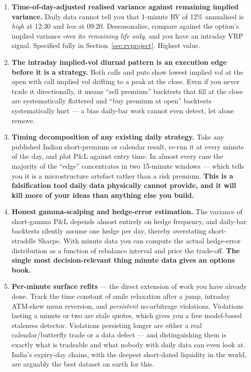 \documentclass[11pt,a4paper]{article}
\begin{document}
\begin{enumerate}
\item \textbf{Time-of-day-adjusted realised variance against remaining implied
variance.} Daily data cannot tell you that 1-minute RV of 12\% annualised is
\emph{high} at 12:30 and \emph{low} at 09:20. Deseasonalise, compare against the
option's implied variance over its \emph{remaining life only}, and you have an
intraday VRP signal. Specified fully in Section~\ref{sec:rvproject}. Highest value.

\item \textbf{The intraday implied-vol diurnal pattern is an execution edge before
it is a strategy.} Both calls and puts show lowest implied vol at the open with
call implied vol drifting to a peak at the close. Even if you never trade it
directionally, it means ``sell premium'' backtests that fill at the close are
systematically flattered and ``buy premium at open'' backtests systematically hurt
--- a bias daily-bar work cannot even detect, let alone remove.

\item \textbf{Timing decomposition of any existing daily strategy.} Take any
published Indian short-premium or calendar result, re-run it at every minute of
the day, and plot P\&L against entry time. In almost every case the majority of
the ``edge'' concentrates in two 15-minute windows --- which tells you it is a
microstructure artefact rather than a risk premium. \textbf{This is a falsification
tool daily data physically cannot provide, and it will kill more of your ideas
than anything else you build.}

\item \textbf{Honest gamma-scalping and hedge-error estimation.} The variance of
short-gamma P\&L depends almost entirely on hedge frequency, and daily-bar
backtests silently assume one hedge per day, thereby overstating short-straddle
Sharpe. With minute data you can compute the actual hedge-error distribution as a
function of rebalance interval and price the trade-off. \textbf{The single most
decision-relevant thing minute data gives an options book.}

\item \textbf{Per-minute surface refits} --- the direct extension of work you have
already done. Track the time constant of smile relaxation after a jump, intraday
ATM-skew mean reversion, and \emph{persistent} no-arbitrage violations. Violations
lasting a minute or two are stale quotes, which gives you a free model-based
staleness detector. Violations persisting longer are either a real
calendar/butterfly trade or a data defect --- and distinguishing them is exactly
what is tradeable and what nobody with daily data can even look at. India's
expiry-day chains, with the deepest short-dated liquidity in the world, are
arguably the best dataset on earth for this.


\end{enumerate}
\end{document}

